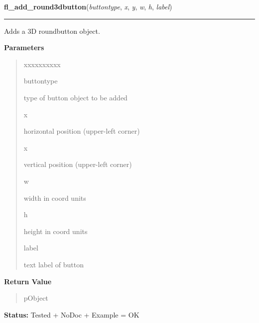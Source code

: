     \label{xformslib:library:fl_add_round3dbutton}

    \vspace{0.5ex}

\hspace{.8\funcindent}\begin{boxedminipage}{\funcwidth}

    \raggedright \textbf{fl\_add\_round3dbutton}(\textit{buttontype}, \textit{x}, \textit{y}, \textit{w}, \textit{h}, \textit{label})

    \vspace{-1.5ex}

    \rule{\textwidth}{0.5\fboxrule}
\setlength{\parskip}{2ex}
    Adds a 3D roundbutton object.

\setlength{\parskip}{1ex}
      \textbf{Parameters}
      \vspace{-1ex}

      \begin{quote}
        \begin{Ventry}{xxxxxxxxxx}

          \item[buttontype]

          type of button object to be added

          \item[x]

          horizontal position (upper-left corner)

          \item[x]

          vertical position (upper-left corner)

          \item[w]

          width in coord units

          \item[h]

          height in coord units

          \item[label]

          text label of button

        \end{Ventry}

      \end{quote}

      \textbf{Return Value}
    \vspace{-1ex}

      \begin{quote}
      pObject

      \end{quote}

\textbf{Status:} Tested + NoDoc + Example = OK



    \end{boxedminipage}

